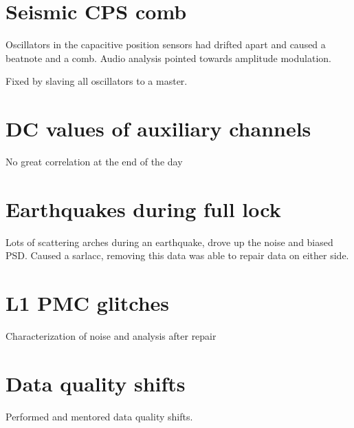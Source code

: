 \section{Seismic CPS comb}

Oscillators in the capacitive position sensors had drifted apart and caused a 
beatnote and a comb. Audio analysis pointed towards amplitude modulation. 

Fixed by slaving all oscillators to a master.

\section{DC values of auxiliary channels}

No great correlation at the end of the day 

\section{Earthquakes during full lock}

Lots of scattering arches during an earthquake, drove up the noise and biased PSD.
Caused a sarlacc, removing this data was able to repair data on either side.

\section{L1 PMC glitches}


Characterization of noise and analysis after repair

\section{Data quality shifts}
Performed and mentored data quality shifts.




